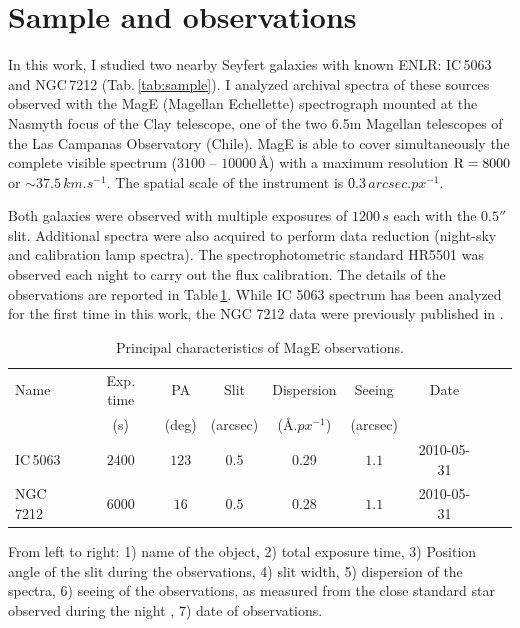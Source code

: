 \documentclass[../main.tex]{subfiles}
\begin{document}
\section{Sample and observations}
\label{sec:sample}

In this work, I studied two nearby Seyfert galaxies with known ENLR: IC\,5063 and NGC\,7212 (Tab.\,\ref{tab:sample}).
I analyzed archival spectra of these sources observed with the MagE (Magellan Echellette) spectrograph mounted at the Nasmyth focus of the Clay telescope, one of the two 6.5m Magellan telescopes of the Las Campanas Observatory (Chile).
MagE is able to cover simultaneously the complete visible spectrum ($3100$ -- $10000\,\si{\angstrom}$) with a maximum resolution $\rm R=8000$ or $\sim 37.5\,\si{km.s^{-1}}$\citep{Marshall08}.
The spatial scale of the instrument is $0.3\,\si{arcsec.px^{-1}}$.

Both galaxies were observed with multiple exposures of $1200\,\si{s}$ each with the $0.5''$ slit.
Additional spectra were also acquired to perform data reduction (night-sky and calibration lamp spectra).
The spectrophotometric standard HR5501 was observed each night to carry out the flux calibration.
The details of the observations are reported in Table\,\ref{tab:obs}. 
While IC 5063 spectrum has been analyzed for the first time in this work, the NGC 7212 data were previously published in \citet{Cracco11}.

\begin{table}
\caption[]{Principal characteristics of MagE observations.}
\label{tab:obs}
\centering
\footnotesize
\begin{threeparttable}
\begin{tabular}{lcccccccc}
\hline
Name&Exp. time & PA & Slit & Dispersion &Seeing& Date \\
& (s)& (deg)& (arcsec)&($\si{\angstrom.px^{-1}}$)& (arcsec)&\\
\hline
IC\,5063& $2400$&$123$&$0.5$&0.29 &$1.1$&2010-05-31\\
NGC\,7212&$6000$&$16$&$0.5$&0.28 &$1.1$&2010-05-31\\
\hline
\end{tabular}
\small
\begin{tablenotes}
\item From left to right: 1) name of the object, 2) total exposure time, 3) Position angle of the slit during the observations, 4) slit width, 5) dispersion of the spectra, 6) seeing of the observations, as measured from the close standard star observed during the night , 7) date of observations.
\end{tablenotes}
\end{threeparttable}
\normalsize
\end{table}
\end{document}
